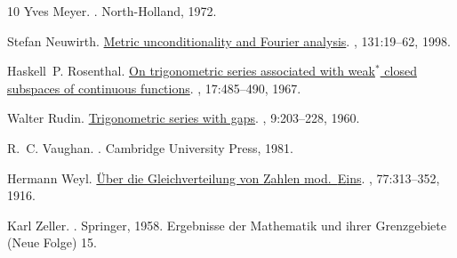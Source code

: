 \documentclass[a4paper]{article}
\begin{document}
\begin{thebibliography}{10}
Yves Meyer.
.
\newblock North-Holland, 1972.

Stefan Neuwirth.
\newblock \href{http://matwbn.icm.edu.pl/ksiazki/sm/sm131/sm13112.pdf} {Metric
  unconditionality and {F}ourier analysis}.
, 131:19--62, 1998.

Haskell~P. Rosenthal.
\newblock \href{http://dx.doi.org/10.1512/iumj.1967.17.17029} {On trigonometric
  series associated with weak$^*$ closed subspaces of continuous functions}.
, 17:485--490, 1967.

Walter Rudin.
\newblock
  \href{http://www.iumj.indiana.edu/IUMJ/dfulltext.php?year=1960&volume=9&arti%
d=59013}{Trigonometric series with gaps}.
, 9:203--228, 1960.

R.~C. Vaughan.
.
\newblock Cambridge University Press, 1981.

Hermann Weyl.
\newblock
  \href{http://dz-srv1.sub.uni-goettingen.de/sub/digbib/loader?did=D37495}
  {{\"U}ber die {G}leichverteilung von {Z}ahlen mod.\ {E}ins}.
, 77:313--352, 1916.

Karl Zeller.
.
\newblock Springer, 1958.
\newblock Ergebnisse der Mathematik und ihrer Grenzgebiete (Neue Folge) 15.

\end{thebibliography}
\end{document}
